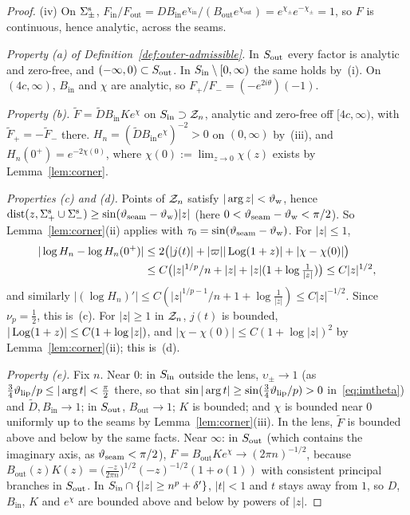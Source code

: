 \begin{proof}
(iv) On $\Sigma^{\mathrm{s}}_\pm$, $F_{\mathrm{in}}/F_{\mathrm{out}}=DB_{\mathrm{in}}e^{\chi_{\mathrm{in}}}/(B_{\mathrm{out}}e^{\chi_{\mathrm{out}}})
=e^{\chi_\pm}e^{-\chi_\pm}=1$, so $F$ is continuous, hence analytic, across the seams.

\emph{Property (a) of Definition~\ref{def:outer-admissible}.} In $S_{\mathrm{out}}$ every factor is analytic and zero-free, and $(-\infty,0)\subset S_{\mathrm{out}}$. In $S_{\mathrm{in}}\setminus[0,\infty)$
the same holds by~(i). On $(4c,\infty)$, $B_{\mathrm{in}}$ and $\chi$ are analytic, so $F_+/F_-=(-e^{2i\theta})(-1)$.

\emph{Property (b).} $\tilde F=\tilde DB_{\mathrm{in}}Ke^\chi$ on $S_{\mathrm{in}}\supset\mathcal{Z}_n$, analytic and zero-free off $[4c,\infty)$, with
$\tilde F_+=-\tilde F_-$ there. $H_n=(\tilde DB_{\mathrm{in}}e^{\chi})^{-2}>0$ on $(0,\infty)$ by~(iii), and
$H_n(0^+)=e^{-2\chi(0)}$, where $\chi(0):=\lim_{z\to0}\chi(z)$ exists by Lemma~\ref{lem:corner}.

\emph{Properties (c) and (d).} Points of $\mathcal{Z}_n$ satisfy $|\arg z|<\vartheta_{\mathrm{w}}$, hence $\mathrm{dist}(z,\Sigma^{\mathrm{s}}_+\cup\Sigma^{\mathrm{s}}_-)\ge\sin(\vartheta_{\mathrm{seam}}-\vartheta_{\mathrm{w}})|z|$
(here $0<\vartheta_{\mathrm{seam}}-\vartheta_{\mathrm{w}}<\pi/2$). So Lemma~\ref{lem:corner}(ii) applies with $\tau_0=\sin(\vartheta_{\mathrm{seam}}-\vartheta_{\mathrm{w}})$. For $|z|\le1$,
\begin{align*}
  |\log H_n-\log H_n(0^+)|&\le2\bigl(|j(t)|+|\varpi||\operatorname{Log}(1+z)|+|\chi-\chi(0)|\bigr)\\
  &\le C\bigl(|z|^{1/p}/n+|z|+|z|(1+\log\tfrac1{|z|})\bigr)\le C|z|^{1/2},
\end{align*}
and similarly $|(\log H_n)'|\le C(|z|^{1/p-1}/n+1+\log\frac1{|z|})\le C|z|^{-1/2}$. Since $\nu_p=\frac12$, this is~(c). For
$|z|\ge1$ in $\mathcal{Z}_n$, $j(t)$ is bounded, $|\operatorname{Log}(1+z)|\le C(1+\log|z|)$, and $|\chi-\chi(0)|\le C(1+\log|z|)^2$ by
Lemma~\ref{lem:corner}(ii); this is~(d).

\emph{Property (e).} Fix $n$. Near $0$: in $S_{\mathrm{in}}$ outside the lens, $\upsilon_\pm\to1$ (as $\frac34\vartheta_{\mathrm{lip}}/p\le|\arg t|<\frac\pi2$ there, so that
$\sin|\arg t|\ge\sin(\frac34\vartheta_{\mathrm{lip}}/p)>0$ in~\eqref{eq:imtheta}) and $\tilde D,B_{\mathrm{in}}\to1$; in $S_{\mathrm{out}}$, $B_{\mathrm{out}}\to1$; $K$ is bounded; and $\chi$ is
bounded near $0$ uniformly up to the seams by Lemma~\ref{lem:corner}(iii). In the lens, $\tilde F$ is bounded above and
below by the same facts. Near $\infty$: in $S_{\mathrm{out}}$ (which contains the imaginary axis, as $\vartheta_{\mathrm{seam}}<\pi/2$),
$F=B_{\mathrm{out}}Ke^\chi\to(2\pi n)^{-1/2}$, because $B_{\mathrm{out}}(z)K(z)=\bigl(\frac{-z}{2\pi n}\bigr)^{1/2}(-z)^{-1/2}(1+o(1))$
with consistent principal branches in $S_{\mathrm{out}}$. In $S_{\mathrm{in}}\cap\{|z|\ge n^p+\delta'\}$, $|t|<1$ and $t$ stays away from $1$, so
$D$, $B_{\mathrm{in}}$, $K$ and $e^\chi$ are bounded above and below by powers of $|z|$.
\end{proof}

